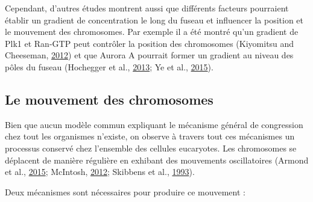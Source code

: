 \documentclass[12pt,a4paper,twoside,openright]{book}
\begin{document}
Cependant, d'autres études montrent aussi que différents facteurs
pourraient établir un gradient de concentration le long du fuseau et
influencer la position et le mouvement des chromosomes. Par exemple il a
été montré qu'un gradient de Plk1 et Ran-GTP peut contrôler la position
des chromosomes (Kiyomitsu and Cheeseman,
\hyperref[ref-Kiyomitsu2012]{2012}) et que Aurora A pourrait former un
gradient au niveau des pôles du fuseau (Hochegger et al.,
\hyperref[ref-Hochegger2013]{2013}; Ye et al.,
\hyperref[ref-Ye2015]{2015}).

\subsection{Le mouvement des
chromosomes}\label{le-mouvement-des-chromosomes}

Bien que aucun modèle commun expliquant le mécanisme général de
congression chez tout les organismes n'existe, on observe à travers tout
ces mécanismes un processus conservé chez l'ensemble des cellules
eucaryotes. Les chromosomes se déplacent de manière régulière en
exhibant des mouvements oscillatoires (Armond et al.,
\hyperref[ref-Armond2015]{2015}; McIntosh,
\hyperref[ref-McIntosh2012]{2012}; Skibbens et al.,
\hyperref[ref-Skibbens1993]{1993}).

Deux mécanismes sont nécessaires pour produire ce mouvement :
\end{document}
